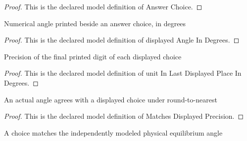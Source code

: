 \begin{proof}
  This is the declared model definition of Answer Choice.
\end{proof}
\begin{definition}
  \label{def:physics:phyx-mini-0901:phyxminiproblems-problemphyxmini0901-answerchoice-displayedangleindegrees}
  Numerical angle printed beside an answer choice, in degrees
\end{definition}
\begin{proof}
  This is the declared model definition of displayed Angle In Degrees.
\end{proof}
\begin{definition}
  \label{def:physics:phyx-mini-0901:phyxminiproblems-problemphyxmini0901-answerchoice-unitinlastdisplayedplaceindegrees}
  Precision of the final printed digit of each displayed choice
\end{definition}
\begin{proof}
  This is the declared model definition of unit In Last Displayed Place In Degrees.
\end{proof}
\begin{definition}
  \label{def:physics:phyx-mini-0901:phyxminiproblems-problemphyxmini0901-matchesdisplayedprecision}
  An actual angle agrees with a displayed choice under round-to-nearest
\end{definition}
\begin{proof}
  This is the declared model definition of Matches Displayed Precision.
\end{proof}
\begin{definition}
  \label{def:physics:phyx-mini-0901:phyxminiproblems-problemphyxmini0901-ismatchinganswer}
  A choice matches the independently modeled physical equilibrium angle
\end{definition}
